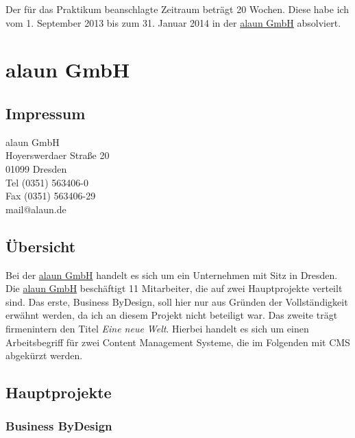 \documentclass[12pt]{article}
\begin{document}
Der für das Praktikum beanschlagte Zeitraum beträgt 20 Wochen. Diese habe ich vom 1. September 2013
bis zum 31. Januar 2014 in der \href{https://alaun.de/home/}{alaun GmbH} absolviert.

\section{alaun GmbH}

\subsection{Impressum}

\begin{minipage}{\linewidth}

alaun GmbH \\
Hoyerswerdaer Straße 20 \\
01099 Dresden \\

Tel (0351) 563406-0  \\
Fax (0351) 563406-29 \\

mail@alaun.de 

\end{minipage}

\subsection{Übersicht}

Bei der \href{https://alaun.de/home/}{alaun GmbH} handelt es sich um ein Unternehmen mit Sitz in Dresden.
Die \href{https://alaun.de/home/}{alaun GmbH} beschäftigt 11 Mitarbeiter, die auf zwei Hauptprojekte verteilt
sind. Das erste, Business ByDesign, soll hier nur aus Gründen der Vollständigkeit erwähnt werden, 
da ich an diesem Projekt nicht beteiligt war. Das zweite trägt firmenintern den Titel \textit{Eine neue Welt}.
Hierbei handelt es sich um einen Arbeitsbegriff für zwei Content Management Systeme, die im Folgenden mit CMS abgekürzt werden.

\subsection{Hauptprojekte}

\subsubsection{Business ByDesign}
\end{document}
